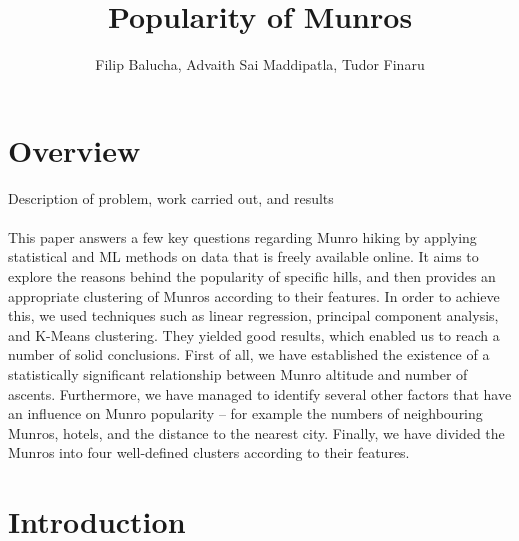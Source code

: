 \documentclass[11pt,a4paper]{article}
\title{Popularity of Munros}
\author{Filip Balucha, Advaith Sai Maddipatla, Tudor Finaru}
\begin{document}
\maketitle


\section{Overview}
Description of problem, work carried out, and results \\ \\ 
This paper answers a few key questions regarding Munro hiking by applying statistical and ML methods on data that is freely available online. It aims to explore the reasons behind the popularity of specific hills, and then provides an appropriate clustering of Munros according to their features. In order to achieve this, we used techniques such as linear regression, principal component analysis, and K-Means clustering. They yielded good results, which enabled us to reach a number of solid conclusions. First of all, we have established the existence of a statistically significant relationship between Munro altitude and number of ascents. Furthermore, we have managed to identify several other factors that have an influence on Munro popularity – for example the numbers of neighbouring Munros, hotels, and the distance to the nearest city. Finally, we have divided the Munros into four well-defined clusters according to their features.

\section{Introduction}
\end{document}
